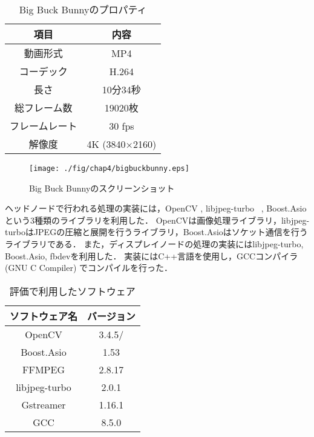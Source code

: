 \begin{table}[htbp]
    \caption{Big Buck Bunnyのプロパティ}
    \begin{center}
    \begin{tabular}{cc}
    \hline
    項目 & 内容 \\\hline\hline
    動画形式　& MP4 \\ \hline
    コーデック & H.264 \cite{h264} \\ \hline
    長さ & 10分34秒 \\ \hline
    総フレーム数 & 19020枚 \\ \hline
    フレームレート & 30 fps \\ \hline
    解像度 & 4K (3840×2160) \\ \hline

    \end{tabular}
    \end{center}
\end{table}

\begin{figure}[H]
    \hspace*{\fill}
    \texttt{[image: ./fig/chap4/bigbuckbunny.eps]}
    \hspace*{\fill}
    \caption{Big Buck Bunnyのスクリーンショット}
   \end{figure}

ヘッドノードで行われる処理の実装には，OpenCV \cite{opencv}, libjpeg-turbo ~\cite{libjpeg}, Boost.Asio \cite{asio}という3種類のライブラリを利用した． 
OpenCVは画像処理ライブラリ，libjpeg-turboはJPEGの圧縮と展開を行うライブラリ，Boost.Asioはソケット通信を行うライブラリである．
また，ディスプレイノードの処理の実装にはlibjpeg-turbo, Boost.Asio, fbdevを利用した．
実装にはC++言語を使用し，GCCコンパイラ (GNU C Compiler) \cite{gcc}でコンパイルを行った．


\begin{table}[htbp]
    \caption{評価で利用したソフトウェア}
    \begin{center}
    \begin{tabular}{cc}
    \hline
    ソフトウェア名 & バージョン \\\hline\hline
    OpenCV & 3.4.5/ \\ \hline
    Boost.Asio \cite{h264} & 1.53  \\ \hline
    FFMPEG & 2.8.17 \\ \hline
    libjpeg-turbo & 2.0.1 \\ \hline
    Gstreamer & 1.16.1 \\ \hline
    GCC & 8.5.0 \\ \hline

    \end{tabular}
    \end{center}
\end{table}


